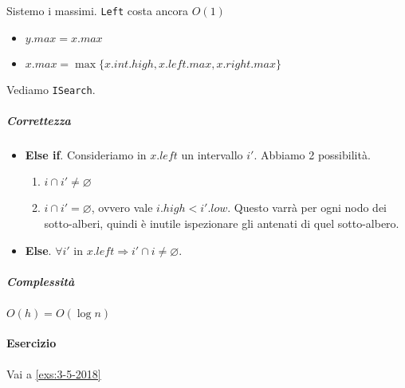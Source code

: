 Sistemo i massimi. \texttt{Left} costa ancora $O(1)$
\begin{itemize}[noitemsep]
    \item $y.max = x.max$
    \item $x.max = \max \{ x.int.high, x.left.max, x.right.max \}$
\end{itemize}

Vediamo \texttt{ISearch}.
 

\subparagraph{Correttezza} 
\begin{itemize}
    \item \textbf{Else if}. Consideriamo in $x.left$ un intervallo $i'$.
    Abbiamo 2 possibilità.
    \begin{enumerate}[label=($\arabic*$)]
        \item $i \cap i' \neq \varnothing$
        \item $i \cap i' = \varnothing$, ovvero vale $i.high < i'.low$. 
        Questo varrà per ogni nodo dei sotto-alberi, quindi è inutile ispezionare
        gli antenati di quel sotto-albero.
    \end{enumerate}
    \item \textbf{Else}. $\forall i'$ in $x.left \Rightarrow i' \cap i \neq \varnothing$.
\end{itemize}

\subparagraph{Complessità} $O(h) = O(\log n)$

\paragraph{Esercizio} Vai a \ref{exs:3-5-2018}